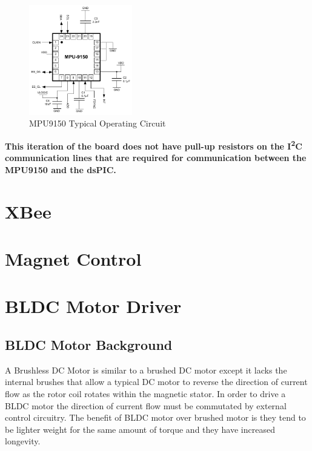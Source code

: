 \documentclass{article}
\begin{document}
\begin{figure}[h!]
	\centering
	\includegraphics[width=0.4\textwidth]{mpu9150}
	\caption{MPU9150 Typical Operating Circuit}
	\label{mpu9150}
\end{figure}

\textbf{This iteration of the board does not have pull-up resistors on the I\textsuperscript{2}C communication lines that are required for communication between the MPU9150 and the dsPIC.}
\section{XBee}

\section{Magnet Control}

\section{BLDC Motor Driver}
\subsection{BLDC Motor Background}
A Brushless DC Motor is similar to a brushed DC motor except it lacks the internal brushes that allow a typical DC motor to reverse the direction of current flow as the rotor coil rotates within the magnetic stator. In order to drive a BLDC motor the direction of current flow must be commutated by external control circuitry. The benefit of BLDC motor over brushed motor is they tend to be lighter weight for the same amount of torque and they have increased longevity.
\end{document}
